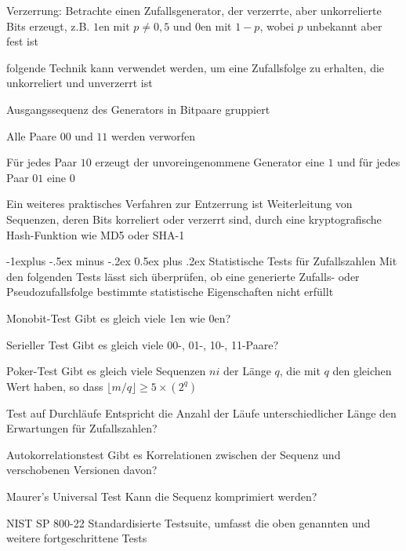 \documentclass[a4paper]{article}
\makeatletter
\renewcommand{\subsection}{\@startsection{subsection}{2}{0mm}%
 {-1explus -.5ex minus -.2ex}%
 {0.5ex plus .2ex}%
 {\normalfont\normalsize\bfseries}}
\makeatother
\begin{document}
\begin{multicols}{3}
\begin{itemize*}
            \item Verzerrung: Betrachte einen Zufallsgenerator, der verzerrte, aber unkorrelierte Bits erzeugt, z.B. $1$en mit $p\not= 0,5$ und $0$en mit $1-p$, wobei $p$ unbekannt aber fest ist
            \item folgende Technik kann verwendet werden, um eine Zufallsfolge zu erhalten, die unkorreliert und unverzerrt ist
            \begin{itemize*}
                  \item Ausgangssequenz des Generators in Bitpaare gruppiert
                  \item Alle Paare $00$ und $11$ werden verworfen
                  \item Für jedes Paar $10$ erzeugt der unvoreingenommene Generator eine $1$ und für jedes Paar $01$ eine $0$
            \end{itemize*}
            \item Ein weiteres praktisches Verfahren zur Entzerrung ist Weiterleitung von Sequenzen, deren Bits korreliert oder verzerrt sind, durch eine kryptografische Hash-Funktion wie MD5 oder SHA-1
      \end{itemize*}

      \subsection{Statistische Tests für Zufallszahlen}
      Mit den folgenden Tests lässt sich überprüfen, ob eine generierte Zufalls- oder Pseudozufallsfolge bestimmte statistische Eigenschaften nicht erfüllt
      \begin{description*}
            \item[Monobit-Test] Gibt es gleich viele 1en wie 0en?
            \item[Serieller Test] Gibt es gleich viele 00-, 01-, 10-, 11-Paare?
            \item[Poker-Test] Gibt es gleich viele Sequenzen $ni$ der Länge $q$, die mit $q$ den gleichen Wert haben, so dass $\lfloor m/q\rfloor\geq 5\times (2^q)$
            \item[Test auf Durchläufe] Entspricht die Anzahl der Läufe unterschiedlicher Länge den Erwartungen für Zufallszahlen?
            \item[Autokorrelationstest] Gibt es Korrelationen zwischen der Sequenz und verschobenen Versionen davon?
            \item[Maurer's Universal Test] Kann die Sequenz komprimiert werden?
            \item[NIST SP 800-22] Standardisierte Testsuite, umfasst die oben genannten und weitere fortgeschrittene Tests
      \end{description*}


\end{multicols}
\end{document}
